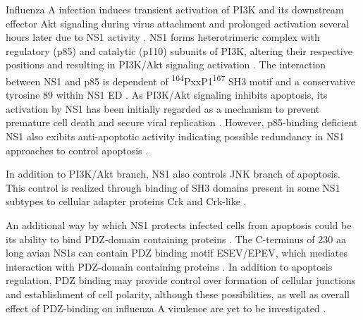 		Influenza A infection induces transient activation of \gls{PI3K} and its downstream effector Akt signaling during virus attachment and prolonged activation several hours later due to \gls{NS1} activity \parencite{Ehrhardt2006, Ehrhardt2009}. \gls{NS1} forms heterotrimeric complex with regulatory (p85) and catalytic (p110) subunits of \gls{PI3K}, altering their respective positions and resulting in \gls{PI3K}/Akt signaling activation \parencite{Hale2008d, Hale2010c}. The interaction between \gls{NS1} and p85 is dependent of \textsuperscript{164}PxxP1\textsuperscript{167} \gls{SH3} motif and a conservative tyrosine 89 within \gls{NS1} \gls{ED} \parencite{Hale2006, Shin2007a, Shin2007}. As \gls{PI3K}/Akt signaling inhibits apoptosis, its activation by \gls{NS1} has been initially regarded as a mechanism to prevent premature cell death and secure viral replication \parencite{Ehrhardt2007, Zhirnov2007}. However, p85-binding deficient \gls{NS1} also exibits anti-apoptotic activity indicating possible redundancy in NS1 approaches to control apoptosis \parencite{Jackson2010a}.
		
		In addition to \gls{PI3K}/Akt branch, \gls{NS1} also controls \gls{JNK} branch of apoptosis. This control is realized through binding of \gls{SH3} domains present in some \gls{NS1} subtypes to cellular adapter proteins Crk and Crk-like \parencite{Heikkinen2008, Hrincius2010}.
		
		An additional way by which \gls{NS1} protects infected cells from apoptosis could be its ability to bind PDZ-domain containing proteins \parencite{Liu2010}. The C-terminus of 230 \gls{aa} long avian \gls{NS1}s can contain PDZ binding motif ESEV/EPEV, which mediates interaction with PDZ-domain containing proteins \parencite{Golebiewski2011}. In addition to apoptosis regulation, PDZ binding may provide control over formation of cellular junctions and establishment of cell polarity, although these possibilities, as well as overall effect of PDZ-binding on influenza A virulence are yet to be investigated \parencite{Jackson2010, Zielecki2010, Javier2011}.
		
		
		
		
				
	
		
